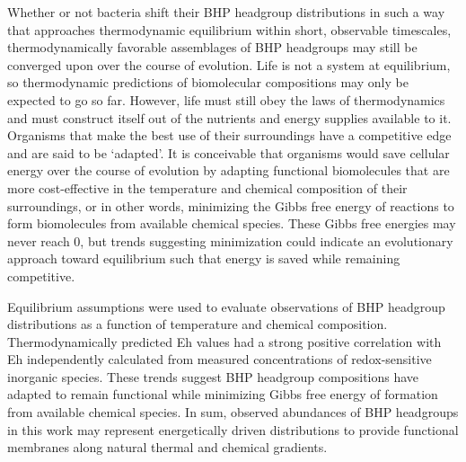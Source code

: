 Whether or not bacteria shift their BHP headgroup distributions in such a way that approaches thermodynamic equilibrium within short, observable timescales, thermodynamically favorable assemblages of BHP headgroups may still be converged upon over the course of evolution. Life is not a system at equilibrium, so thermodynamic predictions of biomolecular compositions may only be expected to go so far. However, life must still obey the laws of thermodynamics and must construct itself out of the nutrients and energy supplies available to it. Organisms that make the best use of their surroundings have a competitive edge and are said to be `adapted'. It is conceivable that organisms would save cellular energy over the course of evolution by adapting functional biomolecules that are more cost-effective in the temperature and chemical composition of their surroundings, or in other words, minimizing the Gibbs free energy of reactions to form biomolecules from available chemical species. These Gibbs free energies may never reach 0, but trends suggesting minimization could indicate an evolutionary approach toward equilibrium such that energy is saved while remaining competitive.

Equilibrium assumptions were used to evaluate observations of BHP headgroup distributions as a function of temperature and chemical composition. Thermodynamically predicted Eh values had a strong positive correlation with Eh independently calculated from measured concentrations of redox-sensitive inorganic species. These trends suggest BHP headgroup compositions have adapted to remain functional while minimizing Gibbs free energy of formation from available chemical species. In sum, observed abundances of BHP headgroups in this work may represent energetically driven distributions to provide functional membranes along natural thermal and chemical gradients.



